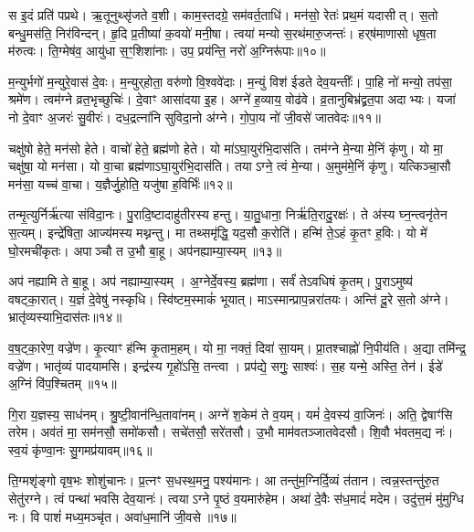 स इ॒दं प्रति॑ पप्रथे।
ऋ॒तूनुथ्सृ॑जते व॒शी।
काम॒स्तदग्रे॒ सम॑वर्त॒ताधि॑।
मन॑सो॒ रेतः॑ प्रथ॒मं यदासीत्।
स॒तो बन्धु॒मस॑ति॒ निर॑विन्दन्।
हृ॒दि प्र॒तीष्या॑ क॒वयो॑ मनी॒षा।
त्वया॑ मन्यो स॒रथ॑मारु॒जन्तः॑।
हर्‌\mbox{}ष॑माणासो धृष॒ता म॑रुत्वः।
ति॒ग्मेष॑व॒ आयु॑धा स॒ꣳ॒शिशा॑नाः।
उप॒ प्रय॑न्ति॒ नरो॑ अ॒ग्निरू॑पाः॥१०॥

म॒न्युर्भगो॑ म॒न्युरे॒वास॑ दे॒वः।
म॒न्युर्‌\mbox{}होता॒ वरु॑णो वि॒श्ववे॑दाः।
म॒न्युं विश॑ ईडते देव॒यन्तीः᳚।
पा॒हि नो॑ मन्यो॒ तप॑सा॒ श्रमे॑ण।
त्वम॑ग्ने व्रत॒भृच्छुचिः॑।
दे॒वाꣳ आसा॑दया इ॒ह।
अग्ने॑ ह॒व्याय॒ वोढ॑वे।
व्र॒तानुबिभ्र॑द्व्रत॒पा अदाभ्यः।
यजा॑ नो दे॒वाꣳ अ॒जरः॑ सु॒वीरः॑।
दध॒द्रत्ना॑नि सुविदा॒नो अ॑ग्ने।
गो॒पा॒य नो॑ जी॒वसे॑ जातवेदः॥११॥\anuvakamend[जिघाꣳ॑सत्य॒मित्राञ्जघ॒न्वानी॑डते॒ सर्वा॒ अꣳह॑सो वातो हृ॒दे रा॑जत्य॒ग्निरू॑पाः सुविदा॒नो अ॑ग्न॒ एकं॑ च]

चक्षु॑षो हेते॒ मन॑सो हेते।
वाचो॑ हेते॒ ब्रह्म॑णो हेते।
यो मा॑\-ऽघा॒युर॑भि॒दास॑ति।
तम॑ग्ने मे॒न्या मे॒निं कृ॑णु।
यो मा॒ चक्षु॑षा॒ यो मन॑सा।
यो वा॒चा ब्रह्म॑णा\-ऽघा॒युर॑भि॒दास॑ति।
तयाऽग्ने॒ त्वं मे॒न्या।
अ॒मुम॑मे॒निं कृ॑णु।
यत्किञ्चा॒सौ मन॑सा॒ यच्च॑ वा॒चा।
य॒ज्ञैर्जु॒होति॒ यजु॑षा ह॒विर्भिः॑॥१२॥

तन्मृ॒त्युर्निर्\mbox{}ऋ॑त्या संविदा॒नः।
पु॒रादि॒ष्टादाहु॑तीरस्य हन्तु।
या॒तु॒धाना॒ निर्\mbox{}ऋ॑ति॒रादु॒रक्षः॑।
ते अ॑स्य घ्न॒न्त्वनृ॑तेन स॒त्यम्।
इन्द्रे॑षिता॒ आज्य॑मस्य मथ्नन्तु।
मा तथ्समृ॑द्धि॒ यद॒सौ क॒रोति॑।
हन्मि॑ ते॒ऽहं कृ॒तꣳ ह॒विः।
यो मे॑ घो॒रमची॑कृतः।
अपाञ्चौ त उ॒भौ बा॒हू।
अप॑नह्याम्या॒स्यम्॥१३॥

अप॑ नह्यामि ते बा॒हू।
अप॑ नह्याम्या॒स्यम्।
अ॒ग्नेर्दे॒वस्य॒ ब्रह्म॑णा।
सर्वं॑ तेऽवधिषं कृ॒तम्।
पु॒रा\-ऽमुष्य॑ वषट्का॒रात्।
य॒ज्ञं दे॒वेषु॑ नस्कृधि।
स्वि॑ष्टम॒स्माकं॑ भूयात्।
माऽस्मान्प्राप॒न्न\-रा॑तयः।
अन्ति॑ दू॒रे स॒तो अ॑ग्ने।
भ्रातृ॑व्यस्याभि॒दास॑तः॥१४॥

व॒ष॒ट्का॒रेण॒ वज्रे॑ण।
कृ॒त्याꣳ ह॑न्मि कृ॒ताम॒हम्।
यो मा॒ नक्तं॒ दिवा॑ सा॒यम्।
प्रा॒तश्चाह्नो॑ नि॒पीय॑ति।
अ॒द्या तमि॑न्द्र॒ वज्रे॑ण।
भातृ॑व्यं पादयामसि।
इन्द्र॑स्य गृ॒हो॑ऽसि॒ तन्त्वा।
प्रप॑द्ये॒ सगुः॒ साश्वः॑।
स॒ह यन्मे॒ अस्ति॒ तेन॑।
ईडे॑ अ॒ग्निं वि॑प॒श्चितम्॥१५॥

गि॒रा य॒ज्ञस्य॒ साध॑नम्।
श्रु॒ष्टी॒वान॑न्धि॒तावा॑नम्।
अग्ने॑ श॒केम॑ ते व॒यम्।
यमं॑ दे॒वस्य॑ वा॒जिनः॑।
अति॒ द्वेषाꣳ॑सि तरेम।
अव॑तं मा॒ सम॑नसौ॒ समो॑कसौ।
सचे॑तसौ॒ सरे॑तसौ।
उ॒भौ माम॑वतञ्जातवेदसौ।
शि॒वौ भ॑वतम॒द्य नः॑।
स्व॒यं कृ॑ण्वा॒नः सु॒गमप्र॑यावम्॥१६॥

ति॒ग्मशृ॑ङ्गो वृष॒भः शोशु॑चानः।
प्र॒त्नꣳ स॒धस्थ॒मनु॒ पश्य॑मानः।
आ तन्तु॑म॒ग्निर्दि॒व्यं त॑तान।
त्वन्न॒स्तन्तु॑रु॒त सेतु॑रग्ने।
त्वं पन्था॑ भवसि देव॒यानः॑।
त्वया\-ऽग्ने पृ॒ष्ठं व॒यमारु॑हेम।
अथा॑ दे॒वैः स॑ध॒मादं॑ मदेम।
उदु॑त्त॒मं मु॑मुग्धि नः।
वि पाशं॑ मध्य॒मञ्चृ॑त।
अवा॑ध॒मानि॑ जी॒वसे॥१७॥

